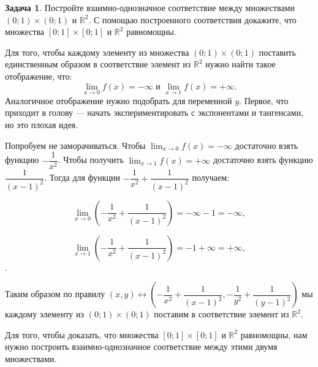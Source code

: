 \documentclass[pdftex, 12pt, a4paper]{article}
\def \mbb{\mathbb}
\def \RR{\mbb R}
\renewcommand{\to}{\rightarrow}
\theoremstyle{definition} %
\newtheorem{problem}{Задача}
\numberwithin{problem}{section}
\numberwithin{blits}{section}
\begin{document}
\begin{problem}\label{upr1}
Постройте взаимно-однозначное соответствие между множествами $(0;1) \times (0;1)$ и $\RR^{2}$. С помощью построенного соответствия докажите, что множества $[0;1] \times [0;1]$ и $\RR^{2}$ равномощны.
\begin{sol}
Для того, чтобы каждому элементу из множества $(0;1) \times (0;1)$ поставить единственным образом в соответствие элемент из $\RR^{2}$ нужно найти такое отображение, что:
\[ \lim_{x \to 0} f(x) = - \infty \text{ и } \lim_{x \to 1} f(x) = + \infty.\] Аналогичное отображение нужно подобрать для переменной $y$. Первое, что приходит в голову --- начать экспериментировать с экспонентами и тангенсами, но это плохая идея.

Попробуем не заморачиваться. Чтобы $\lim_{x \to 0} f(x) = - \infty$ достаточно взять функцию $-\dfrac{1}{x^2}$. Чтобы получить  $\lim_{x \to 1} f(x) = + \infty$ достаточно взять функцию $\dfrac{1}{(x-1)^2}$. Тогда для функции $-\dfrac{1}{x^2} + \dfrac{1}{(x-1)^2}$ получаем:

\[\lim_{x \to 0} \left(-\frac{1}{x^2} + \dfrac{1}{(x-1)^2}\right) = -\infty -1 = -\infty,\]

\[\lim_{x \to 1} \left(-\frac{1}{x^2} + \dfrac{1}{(x-1)^2}\right) = -1 + \infty = +\infty,\].

Таким образом по правилу $(x,y) \leftrightarrow \left(-\dfrac{1}{x^2} + \dfrac{1}{(x-1)^2},-\dfrac{1}{y^2} + \dfrac{1}{(y-1)^2}\right)$ мы каждому элементу из $(0;1) \times (0;1)$ поставим в соответствие элемент из $\RR^{2}$.

Для того, чтобы доказать, что множества $[0;1] \times [0;1]$ и $\RR^{2}$ равномощны, нам нужно построить взаимно-однозначное соответствие между этими двумя множествами.


\end{sol}
\end{problem}
\end{document}
